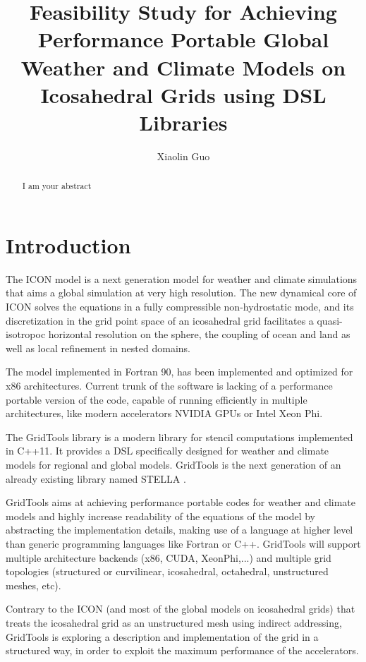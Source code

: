 \documentclass[12pt]{article}
\begin{document}
\title{Feasibility Study for Achieving Performance Portable Global Weather and Climate Models on Icosahedral Grids using DSL Libraries}
\author{Xiaolin Guo}
\maketitle

\begin{abstract}
  I am your abstract
\end{abstract}

\section{Introduction}
The ICON model is a next generation model for weather and climate simulations that aims a global simulation at very high resolution.
The new dynamical core of ICON solves the equations in a fully compressible non-hydrostatic mode, and its discretization in the grid point space of an icosahedral grid facilitates a quasi-isotropoc horizontal resolution on the sphere, the coupling of ocean and land as well as local refinement in nested domains.

The model implemented in Fortran 90, has been implemented and optimized for x86 architectures. Current trunk of the software is lacking of a performance portable version of the code, capable of running efficiently in multiple architectures, like modern accelerators NVIDIA GPUs or Intel Xeon Phi.

The GridTools library is a modern library for stencil computations implemented in C++11. It provides a DSL specifically designed for weather and climate models for regional and global models.
GridTools is the next generation of an already existing library named STELLA \cite{gysi2015stella}.

GridTools aims at achieving performance portable codes for weather and climate models and highly increase readability of the equations of the model by abstracting the implementation details, making use of a language at higher level than generic programming languages like Fortran or C++.
GridTools will support multiple architecture backends (x86, CUDA, XeonPhi,...) and multiple grid topologies (structured or curvilinear, icosahedral, octahedral, unstructured meshes, etc).

Contrary to the ICON (and most of the global models on icosahedral grids) that treats the icosahedral grid as an unstructured mesh using indirect addressing, GridTools is exploring a description and implementation of the grid in a structured way, in order to exploit the maximum performance of the accelerators.
\end{document}
